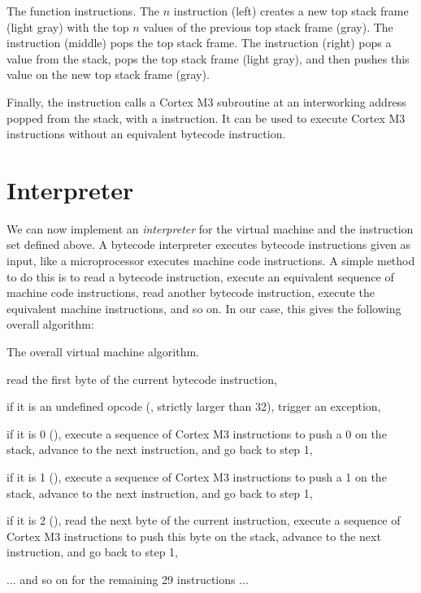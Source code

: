 \begin{Figure}
  

  \caption{The function instructions. The  $n$ instruction (left)
  creates a new top stack frame (light gray) with the top $n$ values of the
  previous top stack frame (gray). The  instruction (middle) pops
  the top stack frame. The  instruction (right) pops a value from the
  stack, pops the top stack frame (light gray), and then pushes this value on
  the new top stack frame (gray).}\label{fig:fn-ret-retv-insns}
\end{Figure}

\begin{Paragraph}
\end{Paragraph}

Finally, the  instruction calls a Cortex M3 subroutine at an
interworking address popped from the stack, with a  instruction. It
can be used to execute Cortex M3 instructions without an equivalent bytecode
instruction.

\section{Interpreter}

We can now implement an {\em interpreter} for the virtual machine and the
instruction set defined above. A bytecode interpreter executes bytecode
instructions given as input, like a microprocessor executes machine code
instructions. A simple method to do this is to read a bytecode instruction,
execute an equivalent sequence of machine code instructions, read another
bytecode instruction, execute the equivalent machine instructions, and so on.
In our case, this gives the following overall algorithm:

\begin{Algorithm}[ht]
\caption{The overall virtual machine algorithm.}\label{alg:vm}
\begin{algorithmic}[1]
  \State read the first byte of the current bytecode instruction,

  \State if it is an undefined opcode (\ie, strictly larger than 32), trigger an
  exception,

  \State if it is 0 (), execute a sequence of Cortex M3
  instructions to push a 0 on the stack, advance to the next instruction, and
  go back to step 1,

  \State if it is 1 (), execute a sequence of Cortex M3
  instructions to push a 1 on the stack, advance to the next instruction, and
  go back to step 1,

  \State if it is 2 (), read the next byte of the current
  instruction, execute a sequence of Cortex M3 instructions to push this byte
  on the stack, advance to the next instruction, and go back to step 1,

  \State ... and so on for the remaining 29 instructions ...
\end{algorithmic}
\end{Algorithm}

